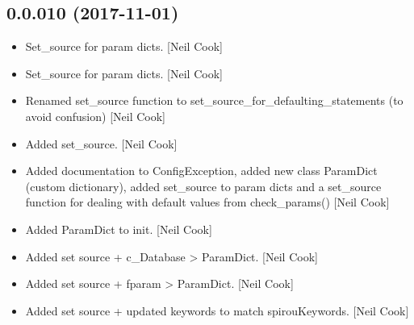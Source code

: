 \documentclass[a4paper,10pt,english]{report}
\begin{document}
\subsection{0.0.010 (2017-11-01)}
\label{\detokenize{misc/changelog:id539}}\begin{itemize}
\item {} 
Set\_source for param dicts. {[}Neil Cook{]}

\item {} 
Set\_source for param dicts. {[}Neil Cook{]}

\item {} 
Renamed set\_source function to set\_source\_for\_defaulting\_statements
(to avoid confusion) {[}Neil Cook{]}

\item {} 
Added set\_source. {[}Neil Cook{]}

\item {} 
Added documentation to ConfigException, added new class ParamDict
(custom dictionary), added set\_source to param dicts and a set\_source
function for dealing with default values from check\_params() {[}Neil
Cook{]}

\item {} 
Added ParamDict to init. {[}Neil Cook{]}

\item {} 
Added set source + c\_Database \textendash{}\textgreater{} ParamDict. {[}Neil Cook{]}

\item {} 
Added set source + fparam \textendash{}\textgreater{} ParamDict. {[}Neil Cook{]}

\item {} 
Added set source + updated keywords to match spirouKeywords. {[}Neil
Cook{]}

\end{itemize}
\end{document}
